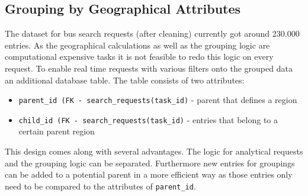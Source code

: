 \subsection{Grouping by Geographical Attributes}
The dataset for bus search requests (after cleaning) currently got around 230.000 entries. As the geographical calculations as well as the grouping logic are computational expensive tasks it is not feasible to redo this logic on every request. To enable real time requests with various filters onto the grouped data an additional database table. The table consists of two attributes: 
\begin{itemize}
\item \verb|parent_id (FK - search_requests(task_id)| - parent that defines a region 
\item \verb|child_id (FK - search_requests(task_id)| - entries that belong to a certain parent region  
\end{itemize}
This design comes along with several advantages. The logic for analytical requests and the grouping logic can be separated. Furthermore new entries for groupings can be added to a potential parent in a more efficient way as those entries only need to be compared to the attributes of \verb|parent_id|.


